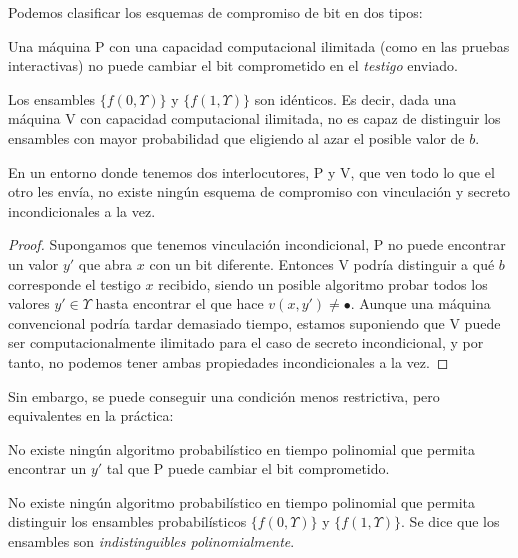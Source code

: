 Podemos clasificar los esquemas de compromiso de bit en dos tipos:

\begin{definition}
	Una máquina P con una capacidad computacional ilimitada (como en las pruebas interactivas) no puede cambiar el bit comprometido en el \textit{testigo} enviado.
\end{definition}

\begin{definition}
	Los ensambles $\{f(0,\Upsilon)\}$ y $\{f(1,\Upsilon)\}$ son idénticos. Es decir, dada una máquina V con capacidad computacional ilimitada, no es capaz de distinguir los ensambles con mayor probabilidad que eligiendo al azar el posible valor de $b$.
\end{definition}

\begin{proposition}
	En un entorno donde tenemos dos interlocutores, P y V, que ven todo lo que el otro les envía, no existe ningún esquema de compromiso con vinculación y secreto incondicionales a la vez.
\end{proposition}

\begin{proof}
	Supongamos que tenemos vinculación incondicional, P no puede encontrar un valor $y'$ que abra $x$ con un bit diferente. Entonces V podría distinguir a qué $b$ corresponde el testigo $x$ recibido, siendo un posible algoritmo probar todos los valores $y'\in \Upsilon$ hasta encontrar el que hace $ v(x,y') \neq \bullet$. Aunque una máquina convencional podría tardar demasiado tiempo, estamos suponiendo que V puede ser computacionalmente ilimitado para el caso de secreto incondicional, y por tanto, no podemos tener ambas propiedades incondicionales a la vez.
\end{proof}

Sin embargo, se puede conseguir una condición menos restrictiva, pero equivalentes en la práctica:

\begin{definition}
	No existe ningún algoritmo probabilístico en tiempo polinomial que permita encontrar un $y'$ tal que P puede cambiar el bit comprometido.
\end{definition}

\begin{definition}
	No existe ningún algoritmo probabilístico en tiempo polinomial que permita distinguir los ensambles probabilísticos $\{f(0,\Upsilon)\}$ y $\{f(1,\Upsilon)\}$. Se dice que los ensambles son \textit{indistinguibles polinomialmente}.
\end{definition}


